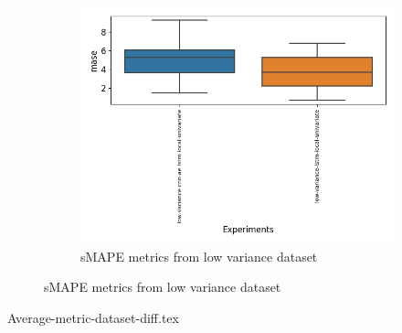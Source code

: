 \begin{figure}[h!]
\begin{subfigure}[b]{0.49\textwidth}
  \end{subfigure}
  \begin{subfigure}[b]{0.49\textwidth}
    \includegraphics[width=\textwidth]{./figs/results/boxplot/mase-dataset_low_variance.png}
    \hfill
    \caption{sMAPE metrics from low variance dataset}

  \end{subfigure}
\end{figure}






{Average-metric-dataset-diff.tex}
